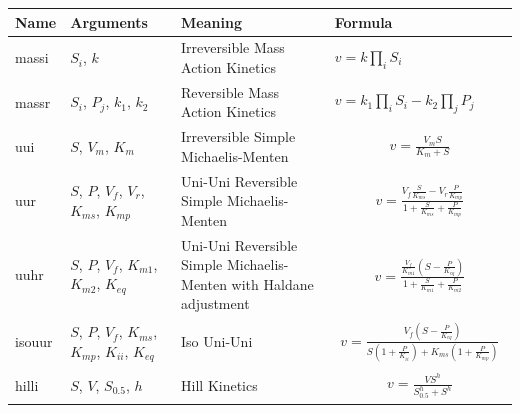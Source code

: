 \documentclass[10pt]{cekarticle}
\newcommand{\D}{\displaystyle}
\begin{document}
\begin{table}[ht]
\setlength{\abovedisplayskip}{-2pt}
\setlength{\belowdisplayskip}{1pt}
\begin{tabular}{|m{0.5in}|>{\raggedright}m{0.77in}|>{\raggedright}m{1.5in}|m{3.03in}|}
\hline
\textbf{Name} & \textbf{Arguments} & \textbf{Meaning} &
\textbf{Formula} \\
\hline

massi & $S_i$, $k$ & Irreversible Mass Action Kinetics &
$v = k \prod_i S_i$
\\ \hline

massr & $S_i$, $P_j$, $k_1$, $k_2$ & Reversible Mass Action Kinetics  &
$v = k_1 \prod_i S_i - k_2 \prod_j P_j$
\\ \hline

uui & $S$, $V_m$, $K_m$ & Irreversible Simple Michaelis-Menten  &
\begin{gather*}
v = \frac{V_m S}{K_m + S}
\end{gather*}
\\ \hline

uur & $S$, $P$, $V_f$, $V_r$, $K_{ms}$, $K_{mp}$ & Uni-Uni Reversible Simple
Michaelis-Menten &
\begin{gather*}
v = \frac{V_f \frac{\D S}{\D
K_{ms}} - V_r \frac{\D P}{\D K_{mp}}}{1 + \frac{\D S}{\D K_{ms}} +
\frac{\D P}{\D K_{mp}} }
\end{gather*}
\\ \hline

uuhr & $S$, $P$, $V_f$, $K_{m1}$, $K_{m2}$, $K_{eq}$ & Uni-Uni
Reversible Simple Michaelis-Menten with Haldane adjustment &
\begin{gather*}
v = \frac{\frac{V_f}{K_{m1}} \left(S -
\frac{P}{K_{eq}} \right)}{1 + \frac{S}{K_{m1}} + \frac{P}{K_{m2}}}
\end{gather*}
\\ \hline

isouur & $S$, $P$, $V_f$, $K_{ms}$, $K_{mp}$, $K_{ii}$, $K_{eq}$ & Iso Uni-Uni &
\begin{gather*}
v = \frac{V_f \left(S - \frac{P}{K_{eq}}\right)}{S \left(1
+ \frac{P}{K_{ii}}\right) + K_{ms} \left(1 + \frac{P}{K_{mp}}\right)}
\end{gather*}
\\ \hline

hilli & $S$, $V$, $S_{0.5}$, $h$ & Hill Kinetics &
\begin{gather*}
v = \frac{V S^h}{S_{0.5}^h + S^h}
\end{gather*}
\\ \hline


\end{tabular}
\end{table}
\end{document}

